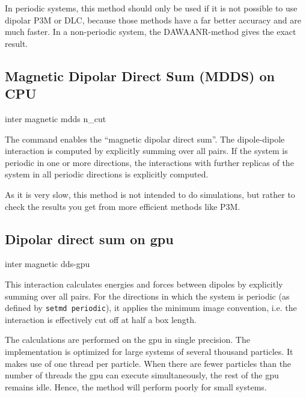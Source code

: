 In periodic systems, this method should only be used if it is not possible to use dipolar P3M or
DLC, because those methods have a far better accuracy and are much faster.
In a non-periodic system, the DAWAANR-method gives the exact result.

\subsection{Magnetic Dipolar Direct Sum (MDDS) on CPU}

\begin{essyntax}
  inter magnetic  mdds n\_cut 
  \begin{features}
  \end{features}
\end{essyntax}

The command enables the ``magnetic dipolar direct sum''.  The
dipole-dipole interaction is computed by explicitly summing over all
pairs. If the system is periodic in one or more directions, the
interactions with further  replicas of the system
in all periodic directions is explicitly computed.

As it is very slow, this method is not intended to do simulations,
but rather to check the results you get from more efficient methods
like P3M.


\subsection{Dipolar direct sum on gpu}

\begin{essyntax}
  inter magnetic  dds-gpu
  \begin{features}
  \end{features}
\end{essyntax}

This interaction calculates energies and forces between dipoles by
explicitly summing over all pairs.  For the directions in which the
system is periodic (as defined by \texttt{setmd periodic}), it applies
the minimum image convention, i.e. the interaction is effectively cut
off at half a box length.

The calculations are performed on the gpu in single precision. The implementation is optimized for large systems of several thousand particles. It makes use of one thread per particle. When there are fewer particles than the number of threads the gpu can execute simultaneously, the rest of the gpu remains idle. Hence, the method will perform poorly for small systems.


